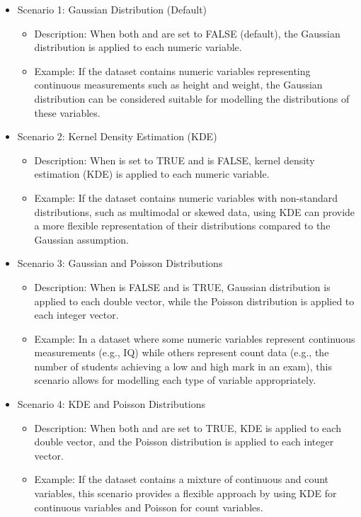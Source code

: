 \documentclass{article}\usepackage[]{graphicx}\usepackage[]{xcolor}
\begin{document}
\begin{itemize}

\item{Scenario 1: Gaussian Distribution (Default)}
    \begin{itemize}
        \item Description: When both \textcolor{darkgreen}{{}} and \textcolor{darkgreen}{{}} are set to FALSE (default), the Gaussian distribution is applied to each numeric variable.
        \item Example: If the dataset contains numeric variables representing continuous measurements such as height and weight, the Gaussian distribution can be considered suitable for modelling the distributions of these variables.
    \end{itemize}

\item{Scenario 2: Kernel Density Estimation (KDE)}
    \begin{itemize}
        \item Description: When \textcolor{darkgreen}{{}} is set to TRUE and \textcolor{darkgreen}{{}} is FALSE, kernel density estimation (KDE) is applied to each numeric variable.
        \item Example: If the dataset contains numeric variables with non-standard distributions, such as multimodal or skewed data, using KDE can provide a more flexible representation of their distributions compared to the Gaussian assumption.
    \end{itemize}

\item{Scenario 3: Gaussian and Poisson Distributions}
    \begin{itemize}
        \item Description: When \textcolor{darkgreen}{{}} is FALSE and \textcolor{darkgreen}{{}} is TRUE, Gaussian distribution is applied to each double vector, while the Poisson distribution is applied to each integer vector.
        \item Example: In a dataset where some numeric variables represent continuous measurements (e.g., IQ) while others represent count data (e.g., the number of students achieving a low and high mark in an exam), this scenario allows for modelling each type of variable appropriately.
    \end{itemize}

\item{Scenario 4: KDE and Poisson Distributions}
    \begin{itemize}
        \item Description: When both \textcolor{darkgreen}{{}} and \textcolor{darkgreen}{{}} are set to TRUE, KDE is applied to each double vector, and the Poisson distribution is applied to each integer vector.
        \item Example: If the dataset contains a mixture of continuous and count variables, this scenario provides a flexible approach by using KDE for continuous variables and Poisson for count variables.
    \end{itemize}


\end{itemize}
\end{document}
